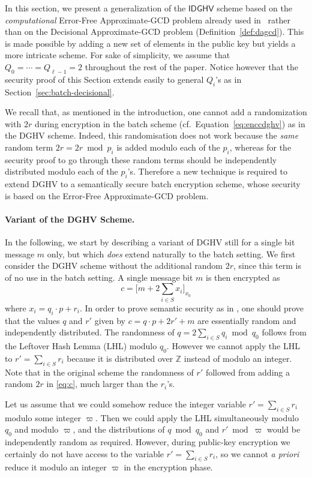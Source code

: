 \documentclass[11pt]{llncs}
\newcommand*{\CDGHV}{\ensuremath{\mathsf{IDGHV}}}
\begin{document}
In this section, we present a generalization of the $\CDGHV$ scheme based on 
the \emph{computational} Error-Free Approximate-GCD problem already used 
in~\cite{vDGHV2010,CMNT2011,CNT2012} rather than on the Decisional 
Approximate-GCD problem (Definition~\ref{def:dagcd}). This is made possible 
by adding a new set of elements in the public key but yields a more intricate 
scheme. For sake of simplicity, we assume that $Q_0=\cdots=Q_{\ell-1}=2$ 
throughout the rest of the paper. Notice however that the security proof of 
this Section extends easily to general $Q_i$'s as in Section~\ref{sec:batch-decisional}.

We recall that, as mentioned in the introduction, one cannot add a
randomization with $2r$ during encryption in the batch scheme (cf.~Equation~\eqref{eq:enccdghv}) as in the DGHV scheme. Indeed, this randomisation does not work because the \emph{same} random term $2r=2r \bmod p_i$ is added
modulo each of the $p_i$, whereas for the security proof to go through
these random terms should be independently distributed modulo each of the
$p_i$'s. Therefore a new technique is required to extend DGHV to
a semantically secure batch encryption scheme, whose security is based on the Error-Free Approximate-GCD problem.

\paragraph{Variant of the DGHV Scheme.} In the following, we start by describing a variant of DGHV still for a
single bit message $m$ only, but which \emph{does} extend naturally to the
batch setting. We first consider the DGHV scheme without the additional
random $2r$, since this term is of no use in the batch setting. A single
message bit $m$ is then encrypted as
\[
    c = \Big[m + 2\sum\limits_{i\in S} x_i\Big]_{x_0}
\]
where $x_i=q_i \cdot p+r_i$. In order to prove semantic security as in
\cite{vDGHV2010}, one should prove that the values $q$ and $r'$ given by
$c=q \cdot p+2r'+m$ are essentially random and independently distributed.
The randomness of $q=2\sum_{i \in S} q_i \bmod q_0$ follows from the
Leftover Hash Lemma (LHL) modulo $q_0$. However we cannot apply the LHL
to $r'=\sum_{i \in S} r_i$ because it is distributed over ${\mathbb Z}$
instead of modulo an integer. Note that in the original scheme the
randomness of $r'$ followed from adding a random $2r$ in \eqref{eq:c},
much larger than the $r_i$'s.

Let us assume that we could somehow reduce the integer variable
$r'=\sum_{i \in S} r_i$ modulo some integer $\varpi$. Then we could apply
the LHL simultaneously modulo $q_0$ and modulo $\varpi$, and the
distributions of $q \bmod q_0$ and $r' \bmod \varpi$ would be
independently random as required. However, during public-key encryption
we certainly do not have access to the variable $r'=\sum_{i \in S} r_i$,
so we cannot \emph{a priori} reduce it modulo an integer $\varpi$ in the
encryption phase.
\end{document}
